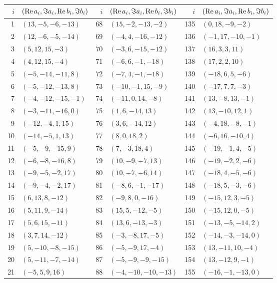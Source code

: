 {\footnotesize
\setlength{\tabcolsep}{5pt}
\begin{longtable}{rlrlrl}
$i$ & $(\operatorname{Re} a_i,\Im a_i,\operatorname{Re} b_i,\Im b_i)$ & $i$ & $(\operatorname{Re} a_i,\Im a_i,\operatorname{Re} b_i,\Im b_i)$ & $i$ & $(\operatorname{Re} a_i,\Im a_i,\operatorname{Re} b_i,\Im b_i)$\\\hline
\endhead
1 & $(13,-5,-6,-13)$ & 68 & $(15,-2,-13,-2)$ & 135 & $(0,18,-9,-2)$\\
2 & $(12,-6,-5,-14)$ & 69 & $(-4,4,-16,-12)$ & 136 & $(-1,17,-10,-1)$\\
3 & $(5,12,15,-3)$ & 70 & $(-3,6,-15,-12)$ & 137 & $(16,3,3,11)$\\
4 & $(4,12,15,-4)$ & 71 & $(-6,6,-1,-18)$ & 138 & $(17,2,2,10)$\\
5 & $(-5,-14,-11,8)$ & 72 & $(-7,4,-1,-18)$ & 139 & $(-18,6,5,-6)$\\
6 & $(-5,-12,-13,8)$ & 73 & $(-10,-1,15,-9)$ & 140 & $(-17,7,7,-3)$\\
7 & $(-4,-12,-15,-1)$ & 74 & $(-11,0,14,-8)$ & 141 & $(13,-8,13,-1)$\\
8 & $(-3,-11,-16,0)$ & 75 & $(1,6,-14,13)$ & 142 & $(13,-10,12,1)$\\
9 & $(-12,-4,1,15)$ & 76 & $(3,6,-14,12)$ & 143 & $(-4,18,-8,-1)$\\
10 & $(-14,-5,1,13)$ & 77 & $(8,0,18,2)$ & 144 & $(-6,16,-10,4)$\\
11 & $(-5,-9,-15,9)$ & 78 & $(7,-3,18,4)$ & 145 & $(-19,-1,4,-5)$\\
12 & $(-6,-8,-16,8)$ & 79 & $(10,-9,-7,13)$ & 146 & $(-19,-2,2,-6)$\\
13 & $(-9,-5,-2,17)$ & 80 & $(10,-7,-6,14)$ & 147 & $(-18,4,-5,-6)$\\
14 & $(-9,-4,-2,17)$ & 81 & $(-8,6,-1,-17)$ & 148 & $(-18,5,-3,-6)$\\
15 & $(6,13,8,-12)$ & 82 & $(-9,8,0,-16)$ & 149 & $(-15,12,3,-5)$\\
16 & $(5,11,9,-14)$ & 83 & $(15,5,-12,-5)$ & 150 & $(-15,12,0,-5)$\\
17 & $(5,6,15,-11)$ & 84 & $(13,6,-13,-3)$ & 151 & $(-13,-5,-14,2)$\\
18 & $(3,7,14,-12)$ & 85 & $(-3,-8,17,-5)$ & 152 & $(-14,-3,-14,0)$\\
19 & $(5,-10,-8,-15)$ & 86 & $(-5,-9,17,-4)$ & 153 & $(13,-11,10,-4)$\\
20 & $(5,-11,-7,-14)$ & 87 & $(-5,-9,-9,-15)$ & 154 & $(13,-12,9,-1)$\\
21 & $(-5,5,9,16)$ & 88 & $(-4,-10,-10,-13)$ & 155 & $(-16,-1,-13,0)$\\

\end{longtable}}
